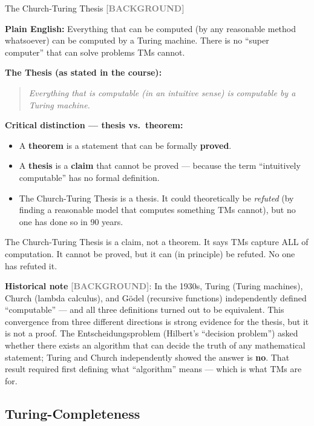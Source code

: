 \documentclass[11pt,a4paper]{article}
\newcommand{\kbg}{\textcolor{gray}{\textbf{[BACKGROUND]}}}
\newcommand{\kt}[1]{\par\vspace{0.3em}\colorbox{yellow!60}{\parbox{\dimexpr\linewidth-2\fboxsep}{#1}}\vspace{0.3em}}
\begin{document}
\begin{conceptbox}{The Church-Turing Thesis \kbg}

\textbf{Plain English:}
Everything that can be computed (by any reasonable method whatsoever) can be computed by a Turing machine. There is no ``super computer'' that can solve problems TMs cannot.

\textbf{The Thesis (as stated in the course):}

\begin{quote}
\textit{Everything that is computable (in an intuitive sense) is computable by a Turing machine.}
\end{quote}

\textbf{Critical distinction --- thesis vs.\ theorem:}
\begin{itemize}[nosep]
\item A \textbf{theorem} is a statement that can be formally \textbf{proved}.
\item A \textbf{thesis} is a \textbf{claim} that cannot be proved --- because the term ``intuitively computable'' has no formal definition.
\item The Church-Turing Thesis is a thesis. It could theoretically be \textit{refuted} (by finding a reasonable model that computes something TMs cannot), but no one has done so in 90 years.
\end{itemize}

\kt{The Church-Turing Thesis is a claim, not a theorem. It says TMs capture ALL of computation. It cannot be proved, but it can (in principle) be refuted. No one has refuted it.}
\end{conceptbox}

\textbf{Historical note} \kbg: In the 1930s, Turing (Turing machines), Church (lambda calculus), and G\"odel (recursive functions) independently defined ``computable'' --- and all three definitions turned out to be equivalent. This convergence from three different directions is strong evidence for the thesis, but it is not a proof. The Entscheidungsproblem (Hilbert's ``decision problem'') asked whether there exists an algorithm that can decide the truth of any mathematical statement; Turing and Church independently showed the answer is \textbf{no}. That result required first defining what ``algorithm'' means --- which is what TMs are for.

\subsection{Turing-Completeness} \label{sec:turingcomplete}
\end{document}

